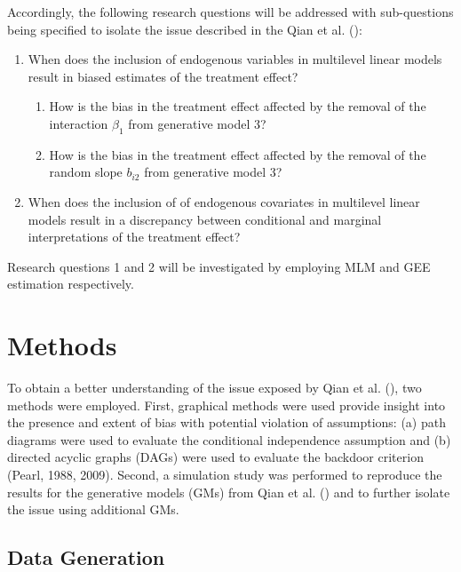 \documentclass[
  12pt,
  a4paper,
]{article}
\begin{document}
Accordingly, the following research questions will be addressed with
sub-questions being specified to isolate the issue described in the Qian
et al. ():

\begin{enumerate}
\def\labelenumi{(\arabic{enumi})}
\item
  When does the inclusion of endogenous variables in multilevel linear
  models result in biased estimates of the treatment effect?

  \begin{enumerate}
  \def\labelenumii{(\alph{enumii})}
  \item
    How is the bias in the treatment effect affected by the removal of
    the interaction \(\beta_1\) from generative model 3?
  \item
    How is the bias in the treatment effect affected by the removal of
    the random slope \(b_{i2}\) from generative model 3?
  \end{enumerate}
\item
  When does the inclusion of of endogenous covariates in multilevel
  linear models result in a discrepancy between conditional and marginal
  interpretations of the treatment effect?
\end{enumerate}

Research questions 1 and 2 will be investigated by employing MLM and GEE
estimation respectively.

\newpage

\section{Methods}\label{methods}

To obtain a better understanding of the issue exposed by Qian et al.
(), two methods were employed. First,
graphical methods were used provide insight into the presence and extent
of bias with potential violation of assumptions: (a) path diagrams were
used to evaluate the conditional independence assumption and (b)
directed acyclic graphs (DAGs) were used to evaluate the backdoor
criterion (Pearl, 1988, 2009). Second, a simulation study was performed
to reproduce the results for the generative models (GMs) from Qian et
al. () and to further isolate the issue
using additional GMs.

\subsection{Data Generation}\label{data-generation}
\end{document}
